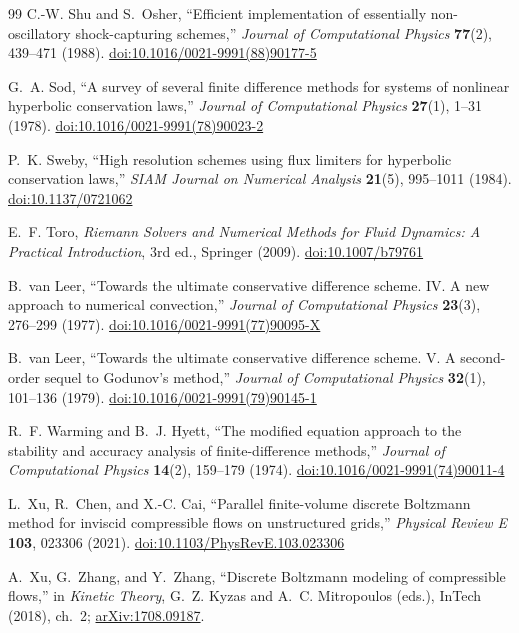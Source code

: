 \documentclass[11pt]{article}
\theoremstyle{remark}
\begin{document}
\begin{thebibliography}{99}
C.-W. Shu and S.~Osher,
``Efficient implementation of essentially non-oscillatory shock-capturing schemes,''
\emph{Journal of Computational Physics} \textbf{77}(2), 439--471 (1988).
\href{https://doi.org/10.1016/0021-9991(88)90177-5}{doi:10.1016/0021-9991(88)90177-5}

G.~A. Sod,
``A survey of several finite difference methods for systems of nonlinear hyperbolic conservation laws,''
\emph{Journal of Computational Physics} \textbf{27}(1), 1--31 (1978).
\href{https://doi.org/10.1016/0021-9991(78)90023-2}{doi:10.1016/0021-9991(78)90023-2}

P.~K. Sweby,
``High resolution schemes using flux limiters for hyperbolic conservation laws,''
\emph{SIAM Journal on Numerical Analysis} \textbf{21}(5), 995--1011 (1984).
\href{https://doi.org/10.1137/0721062}{doi:10.1137/0721062}

E.~F. Toro,
\emph{Riemann Solvers and Numerical Methods for Fluid Dynamics: A Practical Introduction}, 3rd ed.,
Springer (2009).
\href{https://doi.org/10.1007/b79761}{doi:10.1007/b79761}

B.~van Leer,
``Towards the ultimate conservative difference scheme. IV. A new approach to numerical convection,''
\emph{Journal of Computational Physics} \textbf{23}(3), 276--299 (1977).
\href{https://doi.org/10.1016/0021-9991(77)90095-X}{doi:10.1016/0021-9991(77)90095-X}

B.~van Leer,
``Towards the ultimate conservative difference scheme. V. A second-order sequel to Godunov's method,''
\emph{Journal of Computational Physics} \textbf{32}(1), 101--136 (1979).
\href{https://doi.org/10.1016/0021-9991(79)90145-1}{doi:10.1016/0021-9991(79)90145-1}

R.~F. Warming and B.~J. Hyett,
``The modified equation approach to the stability and accuracy analysis of finite-difference methods,''
\emph{Journal of Computational Physics} \textbf{14}(2), 159--179 (1974).
\href{https://doi.org/10.1016/0021-9991(74)90011-4}{doi:10.1016/0021-9991(74)90011-4}

L.~Xu, R.~Chen, and X.-C. Cai,
``Parallel finite-volume discrete Boltzmann method for inviscid compressible flows on unstructured grids,''
\emph{Physical Review E} \textbf{103}, 023306 (2021).
\href{https://doi.org/10.1103/PhysRevE.103.023306}{doi:10.1103/PhysRevE.103.023306}

A.~Xu, G.~Zhang, and Y.~Zhang,
``Discrete Boltzmann modeling of compressible flows,''
in \emph{Kinetic Theory}, G.~Z. Kyzas and A.~C. Mitropoulos (eds.), InTech (2018), ch.~2;
\href{https://arxiv.org/abs/1708.09187}{arXiv:1708.09187}.

\end{thebibliography}
\end{document}
